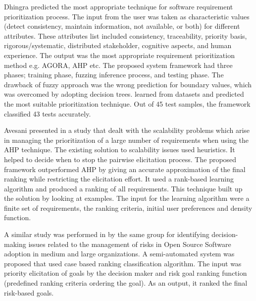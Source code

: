 Dhingra \etal  \cite{S.Dhingra} predicted the most appropriate technique for software requirement prioritization process.
The input from the user was taken as characteristic values (detect consistency, maintain information, not
available, or both) for different attributes. These attributes list included
consistency, traceability, priority basis, rigorous/systematic, distributed
stakeholder, cognitive aspects, and human experience. The output was the most
appropriate requirement prioritization method e.g. AGORA, AHP etc. The proposed
system framework had three phases; training phase, fuzzing inference process,
and testing phase. The drawback of fuzzy approach was the wrong prediction for
boundary values, which was overcomed by adopting decision trees. \DT learned
from datasets and predicted the most suitable prioritization technique. Out of
45 test samples, the framework classified 43 tests accurately.

Avesani \etal presented in \cite{PAvesani} a study that dealt with the
scalability problems which arise in managing the prioritization of a large number of
requirements when using the AHP technique. The existing solution to
scalability issues used heuristics. It helped to decide when
to stop the pairwise elicitation process. The proposed framework outperformed AHP by giving
an accurate approximation of the final ranking while restricting the elicitation
effort. It used a rank-based learning algorithm and produced a ranking of all
requirements. This technique built up the solution by looking at
examples. The input for the learning algorithm were a finite set
of requirements, the ranking criteria, initial user preferences and density function.

A similar study was performed in \cite{7320432} by the same group
\cite{PAvesani} for identifying decision-making issues related to the
management of risks in Open Source Software adoption in medium and large
organizations. A semi-automated system was proposed that used case based
ranking classification algorithm. The input was priority elicitation of goals by
the decision maker and risk goal ranking function (predefined ranking criteria
ordering the goal). As an output, it ranked the final risk-based
goals.



